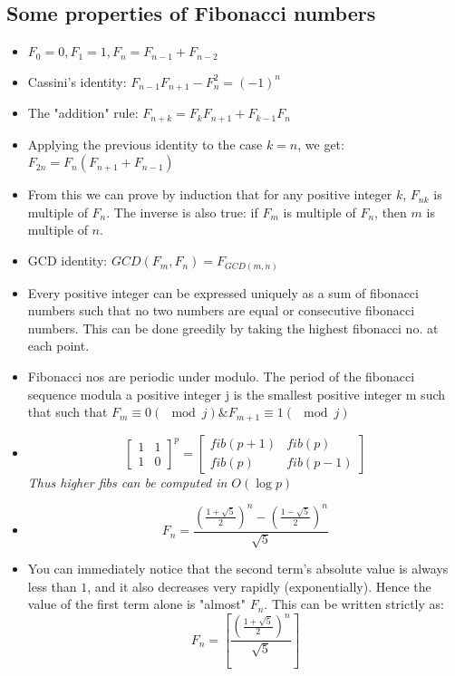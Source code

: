 \documentclass[8pt, a4paper, oneside, twocolumn]{extarticle}
\begin{document}
\subsection{Some properties of Fibonacci numbers}
\begin{itemize}
    \item $F_0 = 0, F_1 = 1, F_n = F_{n-1} + F_{n-2}$
    \item Cassini's identity: $F_{n-1} F_{n+1} - F_n^2 = (-1)^n$
    \item The "addition" rule: $F_{n+k} = F_k F_{n+1} + F_{k-1} F_n$
    \item Applying the previous identity to the case $k = n$, we get: $F_{2n} = F_n (F_{n+1} + F_{n-1})$
    \item From this we can prove by induction that for any positive integer $k$, $F_{nk}$ is multiple of $F_n$.
    The inverse is also true: if $F_m$ is multiple of $F_n$, then $m$ is multiple of $n$.
    \item GCD identity: $GCD(F_m, F_n) = F_{GCD(m, n)}$
    \item Every positive integer can be expressed uniquely as a sum of fibonacci numbers such that no two numbers are equal or consecutive fibonacci numbers. This can be done greedily by taking the highest fibonacci no. at each point.
    \item Fibonacci nos are periodic under modulo. The period of the fibonacci sequence modula a positive integer j is the smallest positive integer m such that such that $F_m \equiv 0 (\mod j) \& F_{m + 1} \equiv 1 (\mod j)$
    \item \[\begin{bmatrix}
    1 & 1\\
    1 & 0
    \end{bmatrix}^{\!p}
=
\begin{bmatrix}
    fib(p + 1) & fib (p)\\
    fib (p) & fib (p - 1)
    \end{bmatrix}
    \]
    \textit{Thus higher fibs can be computed in $O(\log{p})$}
    \item $$F_n = \frac{\left(\frac{1 + \sqrt{5}}{2}\right)^n - \left(\frac{1 - \sqrt{5}}{2}\right)^n}{\sqrt{5}}$$
    \item You can immediately notice that the second term's absolute value is always less than $1$, and it also decreases very rapidly (exponentially). Hence the value of the first term alone is "almost" $F_n$. This can be written strictly as:
    $$F_n = \left[\frac{\left(\frac{1 + \sqrt{5}}{2}\right)^n}{\sqrt{5}}\right]$$
\end{itemize}
\end{document}
